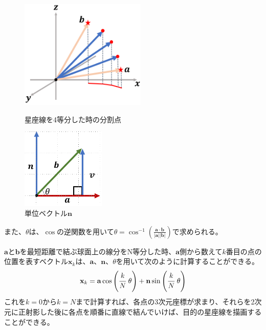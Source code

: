 \documentclass[../main]{subfiles}
\begin{document}
\begin{figure}[H]
  \centering
  \begin{minipage}[b]{0.45\linewidth}
    \centering
    \includegraphics[width=6cm]{sections/Fujisawa/image/starline_split.PNG}
    \caption{星座線を4等分した時の分割点}
    \label{fig:split}
  \end{minipage}
  \begin{minipage}[b]{0.45\linewidth}
    \centering
    \includegraphics[width=4cm]{sections/Fujisawa/image/n_angle.PNG}
    \caption{単位ベクトル$\mathbf{n}$}
    \label{fig02}
  \end{minipage}
\end{figure}

また、$\theta$は、$\cos$の逆関数を用いて$\theta = \cos^{-1}{\left( \frac{ \mathbf{a} \cdot \mathbf{b} }{ |\mathbf{a}| |\mathbf{b} |} \right)}$で求められる。

$\mathbf{a}$と$\mathbf{b}$を最短距離で結ぶ球面上の線分をN等分した時、$\mathbf{a}$側から数えて$k$番目の点の位置を表すベクトル$\mathbf{x}_k$は、$\mathbf{a}$、$\mathbf{n}$、$\theta$を用いて次のように計算することができる。
\[
  \mathbf{x}_k = \mathbf{a}\cos{\left( \cfrac{k}{N}\ \theta \right)} + \mathbf{n}\sin{\left( \cfrac{k}{N}\ \theta \right)}
\]
これを$k=0$から$k=N$まで計算すれば、各点の3次元座標が求まり、それらを2次元に正射影した後に各点を順番に直線で結んでいけば、目的の星座線を描画することができる。
\end{document}
